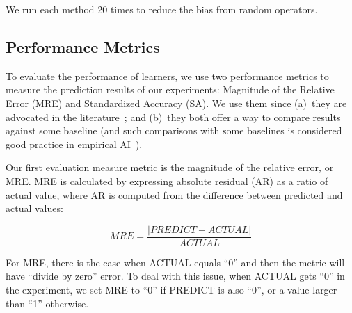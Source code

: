 \documentclass[smallextended]{svjour3}
\newcommand{\BLACK}{\color{black}}
\begin{document}
\BLACK
We run each method 20 times to reduce the bias from random operators.





\subsection{Performance Metrics}
To evaluate the performance of learners, we use two performance metrics to measure the prediction results of our experiments: Magnitude of the Relative Error (MRE) and Standardized Accuracy (SA). We use them since (a)~they are advocated in the literature~\cite{shepperd2012evaluating,sarro2016multi}; and (b)~they both offer a way to compare results against some baseline
(and such  comparisons with some baselines is considered good practice in empirical AI~\cite{Cohen95}).

Our first evaluation measure metric
is the magnitude of the relative error, or MRE. MRE is calculated by expressing absolute residual (AR) as a ratio of actual value, where AR is computed from the difference between predicted and actual values:

\[
\mathit{MRE} = \frac{|\mathit{PREDICT} - \mathit{ACTUAL}|}{\mathit{ACTUAL}}
\]

For MRE, there is the case when ACTUAL equals ``0'' and then the metric will have ``divide by zero'' error. To deal with this issue, when ACTUAL gets ``0'' in the experiment, we set MRE to ``0'' if PREDICT is also ``0'', or a value larger than ``1'' otherwise.
\end{document}
